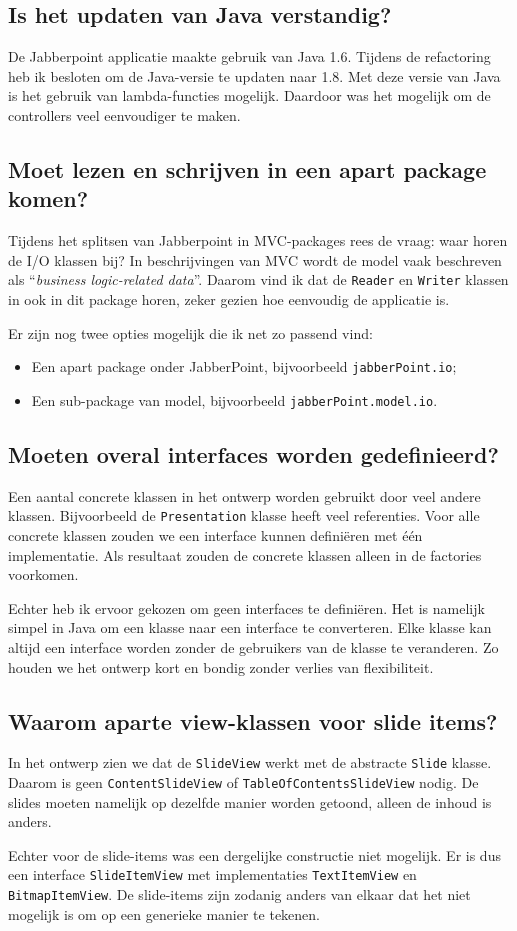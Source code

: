 \documentclass[a4paper]{article}
\newcommand{\question}[1]{
  \subsection{#1}
}
\newcommand{\code}[1]{\lstinline[columns=fixed]{#1}}
\begin{document}
	\question{Is het updaten van Java verstandig?}
		De Jabberpoint applicatie maakte gebruik van Java 1.6.
		Tijdens de refactoring heb ik besloten om de Java-versie te updaten naar 1.8.
		Met deze versie van Java is het gebruik van lambda-functies mogelijk.
		Daardoor was het mogelijk om de controllers veel eenvoudiger te maken.

	\question{Moet lezen en schrijven in een apart package komen?}
		Tijdens het splitsen van Jabberpoint in MVC-packages rees de vraag: waar horen de I/O klassen bij?
		In beschrijvingen van MVC wordt de model vaak beschreven als ``\textit{business logic-related data}''.
		Daarom vind ik dat de \code{Reader} en \code{Writer} klassen in ook in dit package horen, zeker gezien hoe eenvoudig de applicatie is.

		Er zijn nog twee opties mogelijk die ik net zo passend vind:
		\begin{itemize}
			\item Een apart package onder JabberPoint, bijvoorbeeld \code{jabberPoint.io};
			\item Een sub-package van model, bijvoorbeeld \code{jabberPoint.model.io}.
		\end{itemize}

	\question{Moeten overal interfaces worden gedefinieerd?}\label{q:interfaces}
		Een aantal concrete klassen in het ontwerp worden gebruikt door veel andere klassen.
		Bijvoorbeeld de \code{Presentation} klasse heeft veel referenties.
		Voor alle concrete klassen zouden we een interface kunnen definiëren met één implementatie.
		Als resultaat zouden de concrete klassen alleen in de factories voorkomen.

		Echter heb ik ervoor gekozen om geen interfaces te definiëren.
		Het is namelijk simpel in Java om een klasse naar een interface te converteren.
		Elke klasse kan altijd een interface worden zonder de gebruikers van de klasse te veranderen.
		Zo houden we het ontwerp kort en bondig zonder verlies van flexibiliteit.

	\question{Waarom aparte view-klassen voor slide items?}
		In het ontwerp zien we dat de \code{SlideView} werkt met de abstracte \code{Slide} klasse.
		Daarom is geen \code{ContentSlideView} of \code{TableOfContentsSlideView} nodig.
		De slides moeten namelijk op dezelfde manier worden getoond, alleen de inhoud is anders.

		Echter voor de slide-items was een dergelijke constructie niet mogelijk.
		Er is dus een interface \code{SlideItemView} met implementaties \code{TextItemView} en \code{Bitmap}\-\code{ItemView}.
		De slide-items zijn zodanig anders van elkaar dat het niet mogelijk is om op een generieke manier te tekenen.
\end{document}

